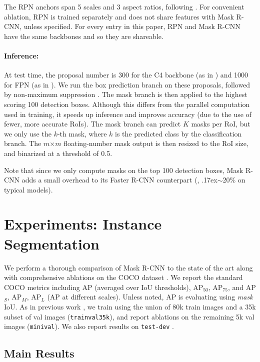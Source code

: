 \documentclass[10pt,twocolumn,letterpaper]{article}
\newcommand{\app}{\raise.17ex\hbox{$\scriptstyle\sim$}}
\begin{document}
The RPN anchors span 5 scales and 3 aspect ratios, following \cite{Lin2017}. For convenient ablation, RPN is trained separately and does not share features with Mask R-CNN, unless specified. For every entry in this paper, RPN and Mask R-CNN have the same backbones and so they are shareable.

\paragraph{Inference:} At test time, the proposal number is 300 for the C4 backbone (as in \cite{Ren2015a}) and 1000 for FPN (as in \cite{Lin2017}). We run the box prediction branch on these proposals, followed by non-maximum suppression \cite{Girshick2015}. The mask branch is then applied to the highest scoring 100 detection boxes. Although this differs from the parallel computation used in training, it speeds up inference and improves accuracy (due to the use of fewer, more accurate RoIs). The mask branch can predict $K$ masks per RoI, but we only use the $k$-th mask, where $k$ is the predicted class by the classification branch. The $m$$\times$$m$ floating-number mask output is then resized to the RoI size, and binarized at a threshold of 0.5.

Note that since we only compute masks on the top 100 detection boxes, Mask R-CNN adds a small overhead to its Faster R-CNN counterpart (\eg, \app20\% on typical models).

\section{Experiments: Instance Segmentation}\label{sec:results}

We perform a thorough comparison of Mask R-CNN to the state of the art along with comprehensive ablations on the COCO dataset \cite{Lin2014}. We report the standard COCO metrics including AP (averaged over IoU thresholds), AP$_{50}$, AP$_{75}$, and AP$_S$, AP$_M$, AP$_L$ (AP at different scales). Unless noted, AP is evaluating using \emph{mask} IoU. As in previous work \cite{Bell2016, Lin2017}, we train using the union of 80k train images and a 35k subset of val images (\texttt{trainval35k}), and report ablations on the remaining 5k val images (\texttt{minival}). We also report results on \texttt{test-dev} \cite{Lin2014}.

\subsection{Main Results}
\end{document}
